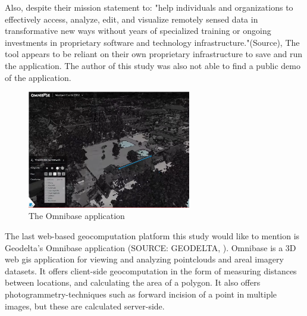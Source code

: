 Also, despite their mission statement to: "help individuals and organizations to effectively access, analyze, edit, and visualize remotely sensed data in transformative new ways without years of specialized training or ongoing investments in proprietary software and technology infrastructure."(Source), The tool appears to be reliant on their own proprietary infrastructure to save and run the application.
The author of this study was also not able to find a public demo of the application. 

\begin{figure}
  \centering
  \graphicspath{ {../../assets/images/background/geo-web/} }
  \includegraphics[width=270px]{omnibase.png}
  \caption{The Omnibase application}
  \label{fig:omnibase}
\end{figure}

The last web-based geocomputation platform this study would like to mention is Geodelta's Omnibase application (SOURCE: GEODELTA, ). 
Omnibase is a 3D web \ac{gis} application for viewing and analyzing pointclouds and areal imagery datasets.
It offers client-side geocomputation in the form of measuring distances between locations, and calculating the area of a polygon.  
It also offers photogrammetry-techniques such as forward incision of a point in multiple images, but these are calculated server-side. 






